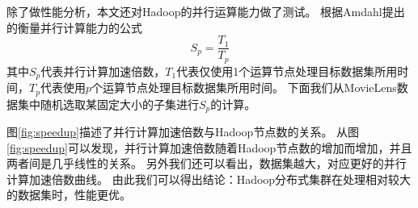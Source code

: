 除了做性能分析，本文还对Hadoop的并行运算能力做了测试。
根据Amdahl\parencite{Amdahl1967Validity}提出的衡量并行计算能力的公式
\begin{equation}
S_p = \frac{T_1}{T_p}
\end{equation}
其中$S_p$代表并行计算加速倍数，$T_1$代表仅使用1个运算节点处理目标数据集所用时间，$T_p$代表使用$p$个运算节点处理目标数据集所用时间。
下面我们从MovieLens数据集中随机选取某固定大小的子集进行$S_p$的计算。
\begin{center}
\pgfplotsset{compat=1.13}
\label{fig:speedup}
\end{center}

图\ref{fig:speedup}描述了并行计算加速倍数与Hadoop节点数的关系。
从图\ref{fig:speedup}可以发现，并行计算加速倍数随着Hadoop节点数的增加而增加，并且两者间是几乎线性的关系。
另外我们还可以看出，数据集越大，对应更好的并行计算加速倍数曲线。
由此我们可以得出结论：Hadoop分布式集群在处理相对较大的数据集时，性能更优。
